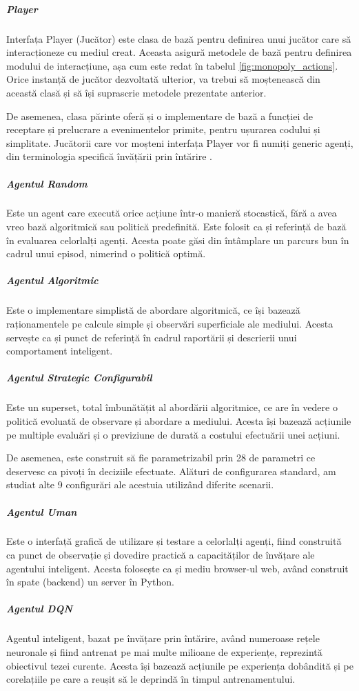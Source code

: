 \subparagraph{Player}
Interfața Player (Jucător) este clasa de bază pentru definirea unui jucător care să interacționeze cu mediul creat. Aceasta asigură metodele de bază pentru definirea modului de interacțiune, așa cum este redat în tabelul \ref{fig:monopoly_actions}. Orice instanță de jucător dezvoltată ulterior, va trebui să moștenească din această clasă și să își suprascrie metodele prezentate anterior.

De asemenea, clasa părinte oferă și o implementare de bază a funcției de receptare și prelucrare a evenimentelor primite, pentru ușurarea codului și simplitate. Jucătorii care vor moșteni interfața Player vor fi numiți generic agenți, din terminologia specifică învățării prin întărire \cite{geeksforgeeks_marl}.

\subparagraph{Agentul Random}
Este un agent care execută orice acțiune într-o manieră stocastică, fără a avea vreo bază algoritmică sau politică predefinită. Este folosit ca și referință de bază în evaluarea celorlalți agenți. Acesta poate găsi din întâmplare un parcurs bun în cadrul unui episod, nimerind o politică optimă.

\subparagraph{Agentul Algoritmic}
Este o implementare simplistă de abordare algoritmică, ce își bazează raționamentele pe calcule simple și observări superficiale ale mediului. Acesta servește ca și punct de referință în cadrul raportării și descrierii unui comportament inteligent.

\subparagraph{Agentul Strategic Configurabil}
Este un superset, total îmbunătățit al abordării algoritmice, ce are în vedere o politică evoluată de observare și abordare a mediului. Acesta își bazează acțiunile pe multiple evaluări și o previziune de durată a costului efectuării unei acțiuni.

De asemenea, este construit să fie parametrizabil prin 28 de parametri ce deservesc ca pivoți în deciziile efectuate. Alături de configurarea standard, am studiat alte 9 configurări ale acestuia utilizând diferite scenarii.

\subparagraph{Agentul Uman}
Este o interfață grafică de utilizare și testare a celorlalți agenți, fiind construită ca punct de observație și dovedire practică a capacităților de învățare ale agentului inteligent. Acesta folosește ca și mediu browser-ul web, având construit în spate (backend) un server în Python.

\subparagraph{Agentul DQN}
Agentul inteligent, bazat pe învățare prin întărire, având numeroase rețele neuronale și fiind antrenat pe mai multe milioane de experiențe, reprezintă obiectivul tezei curente. Acesta își bazează acțiunile pe experiența dobândită și pe corelațiile pe care a reușit să le deprindă în timpul antrenamentului.